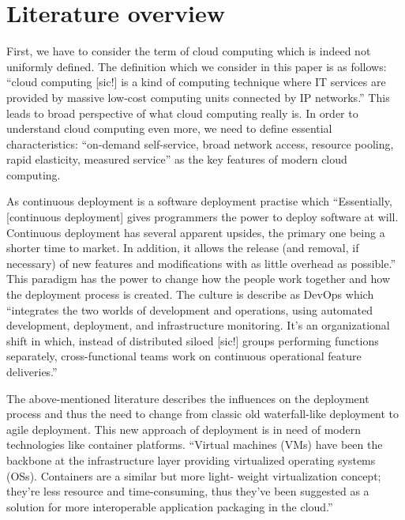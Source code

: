 \documentclass{article}
\begin{document}
\section{Literature overview}

First, we have to consider the term of cloud computing which is indeed not uniformly defined. The definition which we consider in this paper is as follows: \enquote{cloud computing [sic!] is a kind of computing technique where IT services are provided by massive low-cost computing units connected by IP networks.}\cite[p.~627]{qianCloudComputingOverview2009} This leads to broad perspective of what cloud computing really is. In order to understand cloud computing even more, we need to define essential characteristics: \enquote{on-demand self-service, broad network access, resource pooling, rapid elasticity, measured service}\cite[p.~6]{castro-leonCloudServiceUnderstanding2016} as the key features of modern cloud computing. \par
As continuous deployment is a software deployment practise which \enquote{Essentially, [continuous deployment] gives programmers the power to deploy software at will. Continuous deployment has several apparent upsides, the primary one being a shorter time to market. In addition, it allows the release (and removal, if necessary) of new features and modifications with as little overhead as possible.}\cite[p.~64]{leppanenHighwaysCountryRoads2015} This paradigm has the power to change how the people work together and how the deployment process is created. The culture is describe as DevOps which \enquote{integrates the two worlds of development and operations, using automated development, deployment, and infrastructure monitoring. It’s an organizational shift in which, instead of distributed siloed [sic!] groups performing functions separately, cross-functional teams work on continuous operational feature deliveries.}\cite[p.~94]{ebertDevOps2016} \par
The above-mentioned literature describes the influences on the deployment process and thus the need to change from classic old waterfall-like deployment to agile deployment. This new approach of deployment is in need of modern technologies like container platforms. \enquote{Virtual machines (VMs) have been the backbone at the infrastructure layer providing virtualized operating systems (OSs). Containers are a similar but more light- weight virtualization concept; they’re less resource and time-consuming, thus they’ve been suggested as a solution for more interoperable application packaging in the cloud.}\cite[p.~24]{pahlContainerizationPaaSCloud2015}
\end{document}
